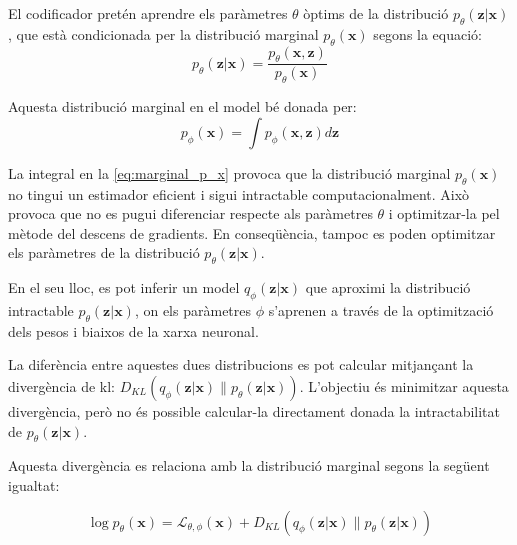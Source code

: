 \documentclass[CAT,BIB]{TFUOC}%
\begin{document}
        El codificador pretén aprendre els paràmetres $\theta$ òptims
        de la distribució $p_\theta(\mathbf{z|x})$,
        que està condicionada per la distribució marginal $p_\theta(\mathbf{x})$
        segons la equació:
        \begin{equation}
        \label{eq:cond_p_z_on_x}
            p_\theta(\mathbf{z|x}) =
            \frac {p_\theta(\mathbf{x,z})}
                  {p_\theta(\mathbf{x})}
        \end{equation}

        Aquesta distribució marginal en el model bé donada per:
        \begin{equation}
        \label{eq:marginal_p_x}
            p_\phi(\mathbf{x}) = \int p_\phi(\mathbf{x, z}) d\mathbf{z}
        \end{equation}

        La integral en la \cref{eq:marginal_p_x} provoca que
        la distribució marginal $p_\theta(\mathbf{x})$ no tingui un estimador eficient
        i sigui intractable computacionalment.
        Això provoca que no es pugui diferenciar respecte als paràmetres $\theta$
        i optimitzar-la pel mètode del descens de gradients.
        En conseqüència,
        tampoc es poden optimitzar els paràmetres de la distribució $p_\theta(\mathbf{z|x})$.

        En el seu lloc,
        es pot inferir un model $q_\phi(\mathbf{z|x})$
        que aproximi la distribució intractable $p_\theta(\mathbf{z|x})$,
        on els paràmetres $\phi$ s'aprenen a través de la optimització
        dels pesos i biaixos de la xarxa neuronal.

        La diferència entre aquestes dues distribucions
        es pot calcular mitjançant la divergència de \gls{kl}:
        $D_{KL} ( q_\phi(\mathbf{z|x}) \| p_\theta(\mathbf{z|x}) )$.
        L'objectiu és minimitzar aquesta divergència,
        però no és possible calcular-la directament
        donada la intractabilitat de $p_\theta(\mathbf{z|x})$.

        Aquesta divergència es relaciona amb la distribució marginal
        segons la següent igualtat:

        \begin{equation}
            \label{eq:kl}
            \log p_\theta(\mathbf{x}) =
            \mathcal{L}_{\theta,\phi}(\mathbf{x}) +
            D_{KL} (
            q_\phi(\mathbf{z|x}) \|
            p_\theta(\mathbf{z|x})
            )
        \end{equation}
\end{document}
